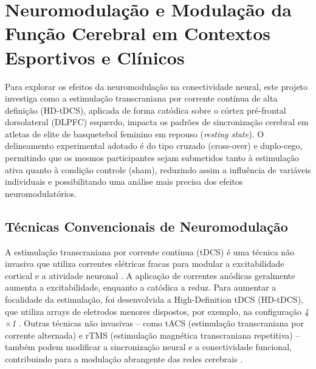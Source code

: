 \section{Neuromodulação e Modulação da Função Cerebral em Contextos Esportivos e Clínicos}
Para explorar os efeitos da neuromodulação na conectividade neural, este projeto investiga como a estimulação transcraniana por corrente contínua de alta definição (HD-tDCS), aplicada de forma catódica sobre o córtex pré-frontal dorsolateral (DLPFC) esquerdo, impacta os padrões de sincronização cerebral em atletas de elite de basquetebol feminino em repouso (\textit{resting state}). O delineamento experimental adotado é do tipo cruzado (cross-over) e duplo-cego, permitindo que os mesmos participantes sejam submetidos tanto à estimulação ativa quanto à condição controle (sham), reduzindo assim a influência de variáveis individuais e possibilitando uma análise mais precisa dos efeitos neuromodulatórios.

\subsection{Técnicas Convencionais de Neuromodulação}
A estimulação transcraniana por corrente contínua (tDCS) é uma técnica não invasiva que utiliza correntes elétricas fracas para modular a excitabilidade cortical e a atividade neuronal \cite{nitsche2000excitability, okano2013estimulacao, stagg2011physiological, purpura1965intracellular}. A aplicação de correntes anódicas geralmente aumenta a excitabilidade, enquanto a catódica a reduz. Para aumentar a focalidade da estimulação, foi desenvolvida a High-Definition tDCS (HD-tDCS), que utiliza arrays de eletrodos menores dispostos, por exemplo, na configuração \emph{4$\times$1} \cite{villamar2013hdtdcs}. Outras técnicas não invasivas – como tACS (estimulação transcraniana por corrente alternada) e rTMS (estimulação magnética transcraniana repetitiva) – também podem modificar a sincronização neural e a conectividade funcional, contribuindo para a modulação abrangente das redes cerebrais \cite{scheler2019neuromodulation, kunze2014high}.

